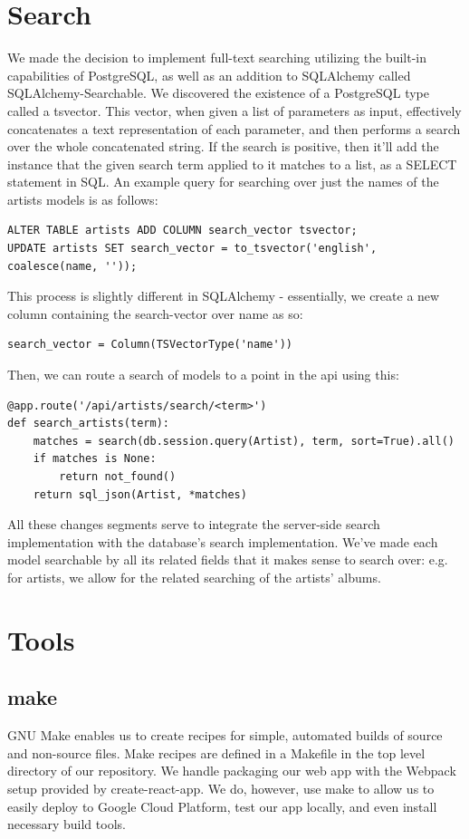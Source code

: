 \documentclass{scrartcl}
\begin{document}
    \section{Search}\label{sec:search}
    We made the decision to implement full-text searching utilizing the built-in capabilities of PostgreSQL, as well as an addition to SQLAlchemy called SQLAlchemy-Searchable.
    We discovered the existence of a PostgreSQL type called a tsvector.
    This vector, when given a list of parameters as input, effectively concatenates a text representation of each parameter, and then performs a search over the whole concatenated string.
    If the search is positive, then it'll add the instance that the given search term applied to it matches to a list, as a SELECT statement in SQL.
    An example query for searching over just the names of the artists models is as follows:
    \begin{verbatim}
ALTER TABLE artists ADD COLUMN search_vector tsvector;
UPDATE artists SET search_vector = to_tsvector('english', coalesce(name, ''));
    \end{verbatim}

    This process is slightly different in SQLAlchemy - essentially, we create a new column containing the search-vector over name as so:\\
    \begin{verbatim}
search_vector = Column(TSVectorType('name'))
    \end{verbatim}
    Then, we can route a search of models to a point in the api using this:
    \begin{verbatim}
@app.route('/api/artists/search/<term>')
def search_artists(term):
    matches = search(db.session.query(Artist), term, sort=True).all()
    if matches is None:
        return not_found()
    return sql_json(Artist, *matches)
    \end{verbatim}

    All these changes segments serve to integrate the server-side search implementation with the database's search implementation.
    We've made each model searchable by all its related fields that it makes sense to search over: e.g. for artists, we allow for the related searching of the artists' albums.

    \section{Tools}\label{sec:tools}

    \subsection{make}\label{subsec:make}
    GNU Make enables us to create recipes for simple, automated builds of source and non-source files.
    Make recipes are defined in a Makefile in the top level directory of our repository.
    We handle packaging our web app with the Webpack setup provided by create-react-app.
    We do, however, use make to allow us to easily deploy to Google Cloud Platform, test our app locally, and even install necessary build tools.
\end{document}
